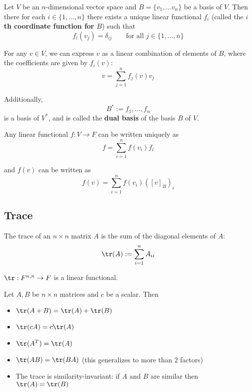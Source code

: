 \begin{definition}
\end{definition}
\begin{definition}
\end{definition}
\begin{lemma}
  Let $V$ be an $n$-dimensional vector space and $B = \{v_1, \ldots v_n\}$ be a basis of $V$. Then there for each $i \in \{1, \ldots, n\}$ there exists a unique linear functional $f_i$ (called the \textbf{$i$th coordinate function for $B$}) such that
  \[
    f_i(v_j) = \delta_{ij} \qquad \text{for all $j \in \{1, \ldots, n\}$}
  \]

  For any $v \in V$, we can express $v$ as a linear combination of elements of $B$, where the coefficients are given by $f_i(v)$:
  \[
    v = \sum_{j = 1}^n f_j(v) v_j
  \]

  Additionally, 
  \[
    B^* := {f_1, \ldots, f_n}
  \]
  is a basis of $V^*$, and is called the \textbf{dual basis} of the basis $B$ of $V$.

  Any linear functional $f : V \to F$ can be written uniquely as
  \[
    f = \sum_{i = 1}^n f(v_i) f_i
  \]

  and $f(v)$ can be written as
  \[
    f(v) = \sum_{i = 1}^n f(v_i) ([v]_B)_i
  \]
\end{lemma}

\subsection{Trace}

\begin{definition}
  The trace of an $n \times n$ matrix $A$ is the sum of the diagonal elements of $A$:
  \[
    \tr(A) := \sum_{i = 1}^n A_{ii}
  \]

  $\tr : F^{n,n} \to F$ is a linear functional.
\end{definition}

\begin{theorem}
  Let $A, B$ be $n \times n$ matrices and $c$ be a scalar. Then
  \begin{itemize}
    \item $\tr(A + B) = \tr(A) + \tr(B)$
    \item $\tr(cA) = c \tr(A)$
    \item $\tr(A^T) = \tr(A)$
    \item $\tr(AB) = \tr(BA)$ (this generalizes to more than 2 factors)
    \item The trace is similarity-invariant: if $A$ and $B$ are similar then $\tr(A) = \tr(B)$
  \end{itemize}
\end{theorem}

